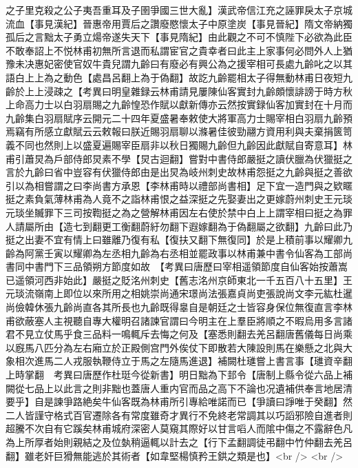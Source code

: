之子里克殺之公子夷吾重耳及子圉爭國三世大亂】漢武帝信江充之誣罪戾太子京城流血【事見漢紀】晉惠帝用賈后之讚廢愍懷太子中原塗炭【事見晉紀】隋文帝納獨孤后之言黜太子勇立煬帝遂失天下【事見隋紀】由此觀之不可不慎陛下必欲為此臣不敢奉詔上不悦林甫初無所言退而私謂宦官之貴幸者曰此主上家事何必問外人上猶豫未决惠妃密使官奴牛貴兒謂九齡曰有廢必有興公為之援宰相可長處九齡叱之以其語白上上為之動色【處昌呂翻上為于偽翻】故訖九齡罷相太子得無動林甫日夜短九齡於上上浸疎之【考異曰明皇雜録云林甫請見屢陳仙客實封九齡頗懷誹謗于時方秋上命高力士以白羽扇賜之九齡惶恐作賦以獻新傳亦云然按實録仙客加實封在十月而九齡集白羽扇賦序云開元二十四年夏盛暑奉敕使大將軍高力士賜宰相白羽扇九齡預焉竊有所感立獻賦云云敕報曰朕近賜羽扇聊以滌暑佳彼勁翮方資用利與夫棄捐篋笥義不同也然則上以盛夏遍賜宰臣扇非以秋日獨賜九齡但九齡因此獻賦自寄意耳】林甫引蕭炅為戶部侍郎炅素不學【炅古迴翻】嘗對中書侍郎嚴挺之讀伏臘為伏獵挺之言於九齡曰省中豈容有伏獵侍郎由是出炅為岐州刺史故林甫怨挺之九齡與挺之善欲引以為相嘗謂之曰李尚書方承恩【李林甫時以禮部尚書相】足下宜一造門與之欵䁥挺之素負氣薄林甫為人竟不之詣林甫恨之益深挺之先娶妻出之更嫁蔚州刺史王元琰元琰坐贓罪下三司按鞫挺之為之營解林甫因左右使於禁中白上上謂宰相曰挺之為罪人請屬所由【造七到翻更工衡翻蔚紆勿翻下遐嫁翻為于偽翻屬之欲翻】九齡曰此乃挺之出妻不宜有情上曰雖離乃復有私【復扶又翻下無復同】於是上積前事以耀卿九齡為阿黨壬寅以耀卿為左丞相九齡為右丞相並罷政事以林甫兼中書令仙客為工部尚書同中書門下三品領朔方節度如故　【考異曰唐歷曰宰相遥領節度自仙客始按蕭嵩已遥領河西非始此】嚴挺之貶洺州刺史【舊志洺州京師東北一千五百八十五里】王元琰流嶺南上即位以來所用之相姚崇尚通宋璟尚法張嘉貞尚吏張說尚文李元紘杜暹尚儉韓休張九齡尚直各其所長也九齡既得辠自是朝廷之士皆容身保位無復直言李林甫欲蔽塞人主視聽自專大權明召諸諫官謂曰今明主在上羣臣將順之不暇烏用多言諸君不見立仗馬乎食三品料一鳴輒斥去悔之何及【塞悉則翻去羌呂翻唐舊儀每日尚乘以廐馬八匹分為左右廂立於正殿側宫門外俟仗下即散若大陳設則馬在樂懸之北與大象相次進馬二人戎服執鞭侍立于馬之左隨馬進退】補闕杜璡嘗上書言事【璡資辛翻上時掌翻　考異曰唐歷作杜珽今從新書】明日黜為下邽令【唐制上縣令從六品上補闕從七品上以此言之則非黜也蓋唐人重内官而品之高下不論也况遺補供奉言地居清要乎】自是諫爭路絶矣牛仙客既為林甫所引專給唯諾而已【爭讀曰諍唯于癸翻】然二人皆謹守格式百官遷除各有常度雖奇才異行不免終老常調其以巧謟邪險自進者則超騰不次自有它蹊矣林甫城府深密人莫窺其際好以甘言㗖人而隂中傷之不露辭色凡為上所厚者始則親結之及位埶稍逼輒以計去之【行下孟翻調徒弔翻中竹仲翻去羌呂翻】雖老奸巨猾無能逃於其術者【如韋堅楊慎矜王鉷之類是也】<br />
<br />
